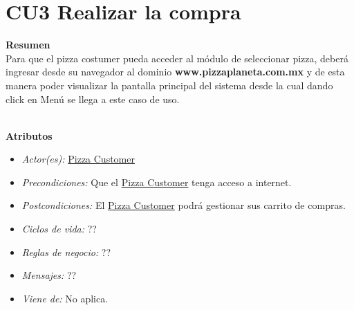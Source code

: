 \hypertarget{CU2}{}
\section{CU3 Realizar la compra}

\noindent \textbf{Resumen}\\

Para que el pizza costumer pueda acceder al módulo de seleccionar pizza, deberá ingresar desde su navegador al dominio {\textbf{www.pizzaplaneta.com.mx}} y de esta manera poder visualizar la pantalla principal del sistema desde la cual dando click en Menú se llega a este caso de uso.

\noindent \textbf{\\Atributos}

\begin{itemize}
	
	\item \textit{Actor(es):} \hyperlink{A:Pizza Customer}{Pizza Customer}
	\item \textit{Precondiciones:} Que el \hyperlink{A:Pizza Customer}{Pizza Customer} tenga acceso a internet. 
	\item \textit{Postcondiciones:} El \hyperlink{A:Pizza Customer}{Pizza Customer} podrá gestionar sus carrito de compras.
	\item \textit{Ciclos de vida:} ?? 
	\item \textit{Reglas de negocio:} ??
	\item \textit{Mensajes:} ??
	\item \textit{Viene de:} No aplica.
	
\end{itemize} 
